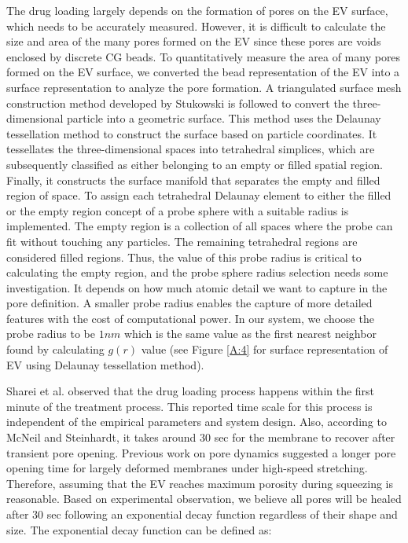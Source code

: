 The drug loading largely depends on the formation of pores on the EV surface, which needs to be accurately measured. However, it is difficult to calculate the size and area of the many pores formed on the EV since these pores are voids enclosed by discrete CG beads. To quantitatively measure the area of many pores formed on the EV surface, we converted the bead representation of the EV into a surface representation to analyze the pore formation. A triangulated surface mesh construction method developed by Stukowski\cite{a63} is followed to convert the three-dimensional particle into a geometric surface. This method uses the Delaunay tessellation method to construct the surface based on particle coordinates. It tessellates the three-dimensional spaces into tetrahedral simplices, which are subsequently classified as either belonging to an empty or filled spatial region. Finally, it constructs the surface manifold that separates the empty and filled region of space. To assign each tetrahedral Delaunay element to either the filled or the empty region concept of a probe sphere with a suitable radius is implemented. The empty region is a collection of all spaces where the probe can fit without touching any particles. The remaining tetrahedral regions are considered filled regions. Thus, the value of this probe radius is critical to calculating the empty region, and the probe sphere radius selection needs some investigation. It depends on how much atomic detail we want to capture in the pore definition. A smaller probe radius enables the capture of more detailed features with the cost of computational power. In our system, we choose the probe radius to be $1 nm$ which is the same value as the first nearest neighbor found by calculating $g(r)$ value (see Figure \ref{A:4} for surface representation of EV using Delaunay tessellation method).

Sharei et al.\cite{a64} observed that the drug loading process happens within the first minute of the treatment process. This reported time scale for this process is independent of the empirical parameters and system design. Also, according to McNeil and Steinhardt\cite{a65}, it takes around 30 sec for the membrane to recover after transient pore opening. Previous work on pore dynamics suggested a longer pore opening time for largely deformed membranes under high-speed stretching. Therefore, assuming that the EV reaches maximum porosity during squeezing is reasonable. Based on experimental observation, we believe all pores will be healed after 30 sec following an exponential decay function regardless of their shape and size. The exponential decay function can be defined as:

